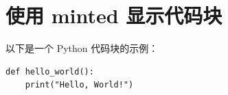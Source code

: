 \documentclass{article}
\begin{document}
\section*{使用 minted 显示代码块}

以下是一个 Python 代码块的示例：

\begin{verbatim}
def hello_world():
    print("Hello, World!")
\end{verbatim}
\end{document}
